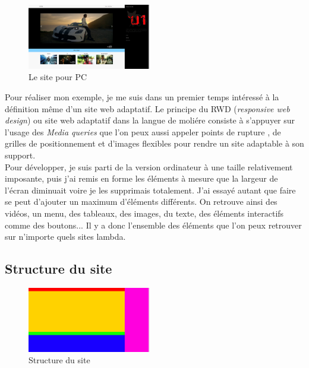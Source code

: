 \documentclass{article}
\begin{document}
\begin{figure}
  \vspace{-20pt}
  \begin{center}
    \includegraphics[width=0.48\textwidth]{p2}
  \end{center}
  \vspace{-20pt}
  \caption{Le site pour PC}
  \vspace{-10pt}
\end{figure}

Pour r\'ealiser mon exemple, je me suis dans un premier temps int\'eress\'e \`a la d\'efinition m\^eme d'un site web adaptatif. Le principe du RWD (\textit{responsive web design}) ou site web adaptatif dans la langue de moli\'ere consiste \`a s'appuyer sur l'usage des \textit{Media queries} que l'on peux aussi appeler \og points de rupture \fg , de grilles de positionnement et d'images flexibles pour rendre un site adaptable \`a son support.\\
Pour d\'evelopper, je suis parti de la version ordinateur \`a une taille relativement imposante, puis j'ai remis en forme les \'el\'ements \`a mesure que la largeur de l'\'ecran diminuait voire je les supprimais totalement. J'ai essay\'e autant que faire se peut d'ajouter un maximum d'\'el\'ements diff\'erents. On retrouve ainsi des vid\'eos, un menu, des tableaux, des images, du texte, des \'el\'ements interactifs comme des boutons... Il y a donc l'ensemble des \'el\'ements que l'on peux retrouver sur n'importe quels sites lambda. \\

\subsection{Structure du site}

\begin{figure}
  \vspace{-20pt}
  \begin{center}
    \includegraphics[width=0.48\textwidth]{p3}
  \end{center}
  \vspace{-20pt}
  \caption{Structure du site}
  \vspace{-10pt}
\end{figure}
\end{document}
